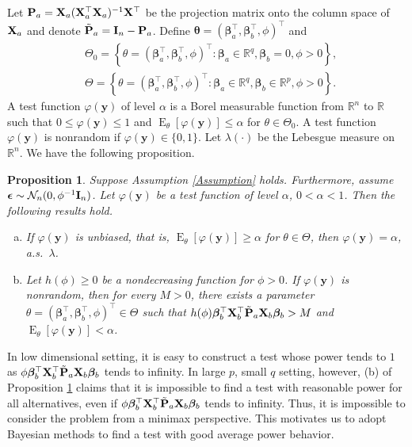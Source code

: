 \documentclass[11pt]{article}
\DeclareMathOperator{\myE}{E}
\newcommand{\By}{\mathbf{y}}    \newcommand{\Bz}{\mathbf{z}}
\newcommand{\bfsym}[1]{\ensuremath{\boldsymbol{#1}}}
\def\bbeta{\bfsym \beta}
\def\btheta{\bfsym {\theta}}           \def\bTheta {\bfsym {\Theta}}
\theoremstyle{plain}
\newtheorem{proposition}{\quad\quad Proposition}
\theoremstyle{definition}
\theoremstyle{remark}
\begin{document}
Let $\mathbf{P}_a=\mathbf{X}_a(\mathbf{X}_a^\top \mathbf{X}_a)^{-1} \mathbf{X}^\top$ be the projection matrix onto the column space of $\mathbf{X}_a$ and denote $\tilde {\mathbf{P}}_a = \mathbf{I}_n-\mathbf{P}_a$.
Define $\btheta =(\bbeta_a^\top , \bbeta_b^\top , \phi)^\top$ and 
\begin{equation*}
    \begin{split}
        &\Theta_0 = \left\{\theta=(\bbeta_a^\top , \bbeta_b^\top , \phi)^\top: \bbeta_a \in \mathbb R^{q}, \bbeta_b=0, \phi>0\right\},
    \\
    &\Theta = \left\{\theta=(\bbeta_a^\top , \bbeta_b^\top , \phi)^\top: \bbeta_a \in \mathbb R^{q}, \bbeta_b\in \mathbb R^p, \phi>0\right\}.
    \end{split}
\end{equation*}
A test function $\varphi(\By)$ of level $\alpha$ is a Borel measurable function from $\mathbb R^n$ to $\mathbb R$ such that $0\leq \varphi(\By) \leq 1$ and $\myE_\theta [\varphi(\By)]\leq \alpha$ for $\theta\in \Theta_0$.
A test function $\varphi(\By)$ is nonrandom if $\varphi(\By)\in\{0,1\}$.
Let $\lambda(\cdot)$ be the Lebesgue measure on $\mathbb R^n$.
We have the following proposition.
\begin{proposition}\label{prop:unbiased}
    Suppose Assumption \ref{Assumption} holds.
    Furthermore, assume $\bepsilon\sim \mathcal N_n (0, \phi^{-1}\BI_n)$.
    Let $\varphi(\By)$ be a test function of level $\alpha$, $0 <\alpha <1$.
Then the following results hold.
\begin{enumerate}[(a)]
    \item 
        If $\varphi(\By)$ is unbiased, that is, $\myE_\theta [\varphi(\By)]\geq \alpha$ for $\theta \in \Theta$, then $\varphi(\By)=\alpha$, a.s.\ $\lambda$.
\item
    Let $h(\phi)\geq 0$ be a nondecreasing function for $\phi>0$.
    If $\varphi(\By)$ is nonrandom, then for every $M>0$, there exists a parameter $\theta=(\bbeta_a^\top,\bbeta_b^\top,\phi)^\top \in \Theta$ such that $h(\phi)\bbeta_b^\top \BX_b^\top \tilde \BP_a \BX_b \bbeta_b > M$ and $\myE_\theta [\varphi(\By)]< \alpha$.
\end{enumerate}
\end{proposition}
In low dimensional setting, it is easy to construct a test whose power tends to $1$ as $\phi \bbeta_b^\top \BX_b^\top \tilde \BP_a \BX_b \bbeta_b$ tends to infinity.
In large $p$, small $q$ setting, however, (b) of Proposition \ref{prop:unbiased} claims that it is impossible to find a test with reasonable power for all alternatives, even if $\phi \bbeta_b^\top \BX_b^\top \tilde \BP_a \BX_b \bbeta_b$ tends to infinity.
Thus, it is impossible to consider the problem from a minimax perspective.
This motivates us to adopt Bayesian methods to find a test with good average power behavior.
\end{document}
